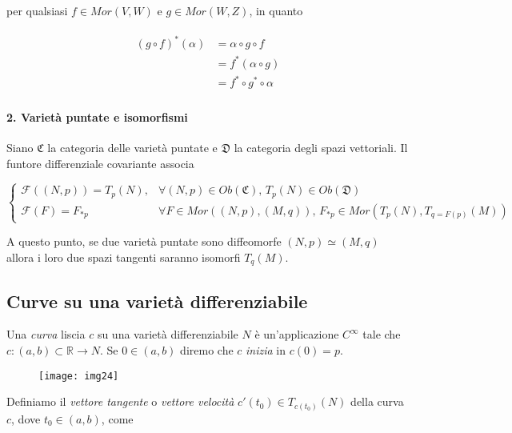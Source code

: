 per qualsiasi $ f \in Mor(V,W) $ e $ g \in Mor(W,Z) $, in quanto

\begin{align}
	\begin{split}
		(g \circ f)^{*}(\alpha) &= \alpha \circ g \circ f\\
		&= f^{*} (\alpha \circ g)\\
		&= f^{*} \circ g^{*} \circ \alpha
	\end{split}
\end{align}

\paragraph{2. Varietà puntate e isomorfismi}

Siano $ \mathfrak{C} $ la categoria delle varietà puntate e $ \mathfrak{D} $ la categoria degli spazi vettoriali. Il funtore differenziale covariante associa

\begin{equation}
	\begin{cases}
		\mathcal{F}((N,p)) = T_{p}(N), & \forall (N,p) \in Ob(\mathfrak{C}), \, T_{p}(N) \in Ob(\mathfrak{D})\\
		\mathcal{F}(F) = F_{*p} & \forall F \in Mor((N,p),(M,q)), \, F_{*p} \in Mor(T_{p}(N),T_{q=F(p)}(M))
	\end{cases}
\end{equation}

A questo punto, se due varietà puntate sono diffeomorfe $ (N,p) \simeq (M,q) $ allora i loro due spazi tangenti saranno isomorfi $ T_{q}(M) $.

\subsection{Curve su una varietà differenziabile}

Una \textit{curva} liscia $ c $ su una varietà differenziabile $ N $ è un'applicazione $ C^{\infty} $  tale che $ c : (a,b) \subset \mathbb{R} \to N $. Se $ 0 \in (a,b) $ diremo che $ c $ \textit{inizia} in $ c(0)=p $.

\begin{figure}[H]
	\centering
	\texttt{[image: img24]}
\end{figure}

Definiamo il \textit{vettore tangente} o \textit{vettore velocità} $ c'(t_{0}) \in T_{c(t_{0})}(N) $ della curva $ c $, dove $ t_{0} \in (a,b) $, come

